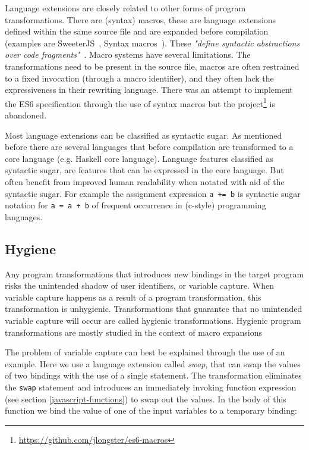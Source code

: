 Language extensions are closely related to other forms of program transformations. There are (syntax) macros\cite{Leavenworth1966}, these are language extensions defined within the same source file and are expanded before compilation (examples are SweeterJS~\cite{Disney2014}, Syntax macros~\cite{Weise1993}). These \textit{"define syntactic abstractions over code fragments"}~\cite{Bravenboer2004}. Macro systems have several limitations. The transformations need to be present in the source file, macros are often restrained to a fixed invocation (through a macro identifier), and they often lack the expressiveness in their rewriting language\cite{Bravenboer2004}. There was an attempt to implement the ES6 specification through the use of syntax macros but the project\footnote{\url{https://github.com/jlongster/es6-macros}} is abandoned.

Most language extensions can be classified as syntactic sugar. As mentioned before there are several languages that before compilation are transformed to a core language (e.g. Haskell core language).  Language features classified as syntactic sugar, are features that can be expressed in the core language. But often benefit from improved human readability when notated with aid of the syntactic sugar. For example the assignment expression \lstinline$a += b$ is syntactic sugar notation for \lstinline$a = a + b$ of frequent occurrence in (c-style) programming languages.

\subsection{Hygiene} \label{hygiene}
Any program transformations that introduces new bindings in the target program risks the unintended shadow of user identifiers, or variable capture. When variable capture happens as a result of a program transformation, this transformation is unhygienic. Transformations that guarantee that no unintended variable capture will occur are called hygienic transformations. Hygienic program transformations are mostly studied in the context of macro expansions~\cite{Herman2010a,Herman2010,Disney2014}

The problem of variable capture can best be explained through the use of an example. Here we use a language extension called \textit{swap}, that can swap the values of two bindings with the use of a single statement. The transformation eliminates the \lstinline$swap$ statement and introduces an immediately invoking function expression (see section \ref{javascript-functions}) to swap out the values. In the body of this function we bind the value of one of the input variables to a temporary binding:

